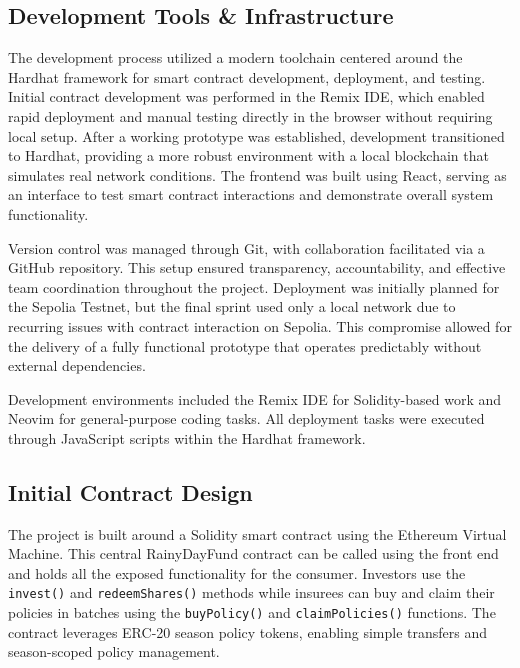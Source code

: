 \documentclass[11pt,a4paper]{article}
\begin{document}
        \subsection{Development Tools \& Infrastructure}\label{subsec:development-tools-infrastructure}
        The development process utilized a modern toolchain centered around the Hardhat framework for smart contract development, deployment, and testing.
        Initial contract development was performed in the Remix IDE, which enabled rapid deployment and manual testing directly in the browser without requiring local setup.
        After a working prototype was established, development transitioned to Hardhat, providing a more robust environment with a local blockchain that simulates real network conditions.
        The frontend was built using React, serving as an interface to test smart contract interactions and demonstrate overall system functionality.

        Version control was managed through Git, with collaboration facilitated via a GitHub repository.
        This setup ensured transparency, accountability, and effective team coordination throughout the project.
        Deployment was initially planned for the Sepolia Testnet\footnotemark{}, but the final sprint used only a local network due to recurring issues with contract interaction on Sepolia. 
        This compromise allowed for the delivery of a fully functional prototype that operates predictably without external dependencies.

        Development environments included the Remix IDE\footnotemark{} for Solidity-based work and Neovim for general-purpose coding tasks.
        All deployment tasks were executed through JavaScript scripts within the Hardhat framework.


        \subsection{Initial Contract Design}\label{subsec:initial-contract-design}
		The project is built around a Solidity smart contract using the Ethereum Virtual Machine.
		This central RainyDayFund contract can be called using the front end and holds all the exposed functionality for the consumer.
		Investors use the \texttt{invest()} and \texttt{redeemShares()} methods while insurees can buy and claim their policies in batches using the \texttt{buyPolicy()} and \texttt{claimPolicies()} functions.
		The contract leverages ERC-20 season policy tokens, enabling simple transfers and season-scoped policy management.
\end{document}
